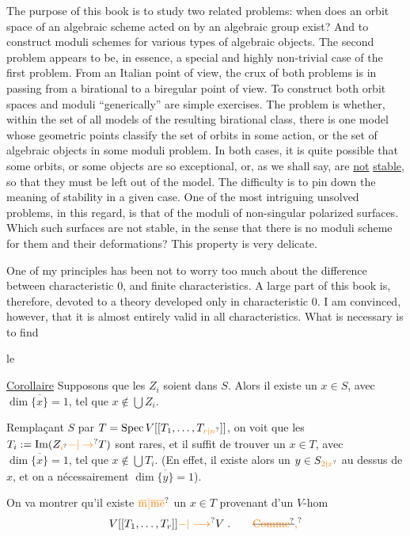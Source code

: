 The purpose of this book is to study two related problems: when does an orbit space of an algebraic scheme acted on by an algebraic group exist? And to construct moduli schemes for various types of algebraic objects. The second problem appears to be, in essence, a special and highly non-trivial case of the first problem. From an Italian point of view, the crux of both problems is in passing from a birational to a biregular point of view. To construct both orbit spaces and moduli ``generically'' are simple exercises. The problem is whether, within the set of all models of the resulting birational class, there is one model whose geometric points classify the set of orbits in some action, or the set of algebraic objects in some moduli problem. In both cases, it is quite possible that some orbits, or some objects are so exceptional, or, as we shall say, are \uline{not} \uline{stable}, so that they must be left out of the model. The difficulty is to pin down the meaning of stability in a given case. One of the most intriguing unsolved problems, in this regard, is that of the moduli of non-singular polarized surfaces. Which such surfaces are not stable, in the sense that there is no moduli scheme for them and their deformations? This property is very delicate.

One of my principles has been not to worry too much about the difference between characteristic $0$, and finite characteristics. A large part of this book is, therefore, devoted to a theory developed only in characteristic $0$. I am convinced, however, that it is almost entirely valid in all characteristics. What is necessary is to find

le

\uline{Corollaire} Supposons que les $Z_i$ soient \uline{} dans $S$. Alors il existe un $x\in S$, avec $\dim\overline{\{x\}}=1$, tel que $x\notin\bigcup Z_i$.

Remplaçant $S$ par $T=\operatorname{Spec} V[[T_1,\ldots,T_{\unsure{r|n}}]]$,  on voit que les $T_i:=\operatorname{Im}(Z_{\unsure{i}}\unsure{-|\to}T)$ sont rares, et il suffit de trouver un $x\in T$, avec $\dim\overline{\{x\}}=1$, tel que $x\notin\bigcup T_i$. (En effet, il existe alors un $y\in S_{\unsure{2|x}}$ au dessus de $x$, et on a nécessairement $\dim\overline{\{y\}}=1$).

On va montrer qu'il existe $\unsure{\overline{\mathrm{m}}|\overline{\mathrm{me}}}$ un $x\in T$ provenant d'un $V$-hom
\[
V[[T_1,\ldots,T_r]]\unsure{-|\longrightarrow}V\;.\qquad \deleted{\text{\unsure{Comme}}}\unsure{\text{,}}
\]

